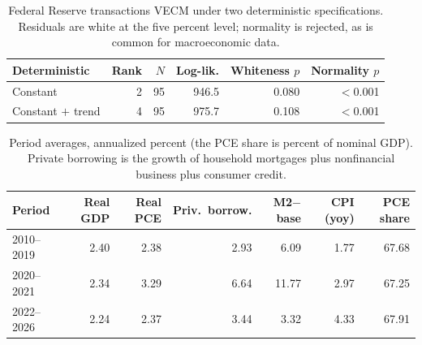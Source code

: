 \begin{table}[htbp]
\centering
\setlength{\belowcaptionskip}{8pt}
\small

\caption{Federal Reserve transactions VECM under two deterministic specifications. Residuals are white at the five percent level; normality is rejected, as is common for macroeconomic data.}
\label{tab:task4vecm}
\begin{tabular}{lrrrrr}
\toprule
Deterministic & Rank & $N$ & Log-lik. & Whiteness $p$ & Normality $p$ \\
\midrule
Constant & 2 & 95 & 946.5 & 0.080 & $<$0.001 \\
Constant $+$ trend & 4 & 95 & 975.7 & 0.108 & $<$0.001 \\
\bottomrule
\end{tabular}
\end{table}

\begin{table}[htbp]
\centering
\setlength{\belowcaptionskip}{8pt}
\small

\caption{Period averages, annualized percent (the PCE share is percent of nominal GDP). Private borrowing is the growth of household mortgages plus nonfinancial business plus consumer credit.}
\label{tab:task5period}
\begin{tabular}{lrrrrrr}
\toprule
Period & Real GDP & Real PCE & Priv.\ borrow. & M2$-$base & CPI (yoy) & PCE share \\
\midrule
2010--2019 & 2.40 & 2.38 & 2.93 & 6.09 & 1.77 & 67.68 \\
2020--2021 & 2.34 & 3.29 & 6.64 & 11.77 & 2.97 & 67.25 \\
2022--2026 & 2.24 & 2.37 & 3.44 & 3.32 & 4.33 & 67.91 \\
\bottomrule
\end{tabular}
\end{table}

